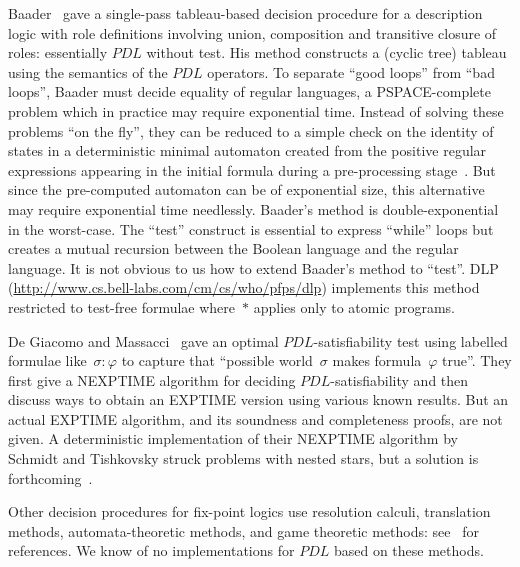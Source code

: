 \documentclass{entcs}
\newcommand{\prp}[1]{#1*}
\newcommand{\pdl}{$PDL$}
\begin{document}
Baader~\cite{baader-augmenting-transitive-closure}
gave a single-pass tableau-based decision procedure for a description logic
with role definitions involving union, composition and transitive closure of roles:
essentially \pdl{} without test.
His method constructs a (cyclic tree) tableau
using the semantics of the \pdl{} operators.
To separate ``good loops'' from ``bad loops'',
Baader must decide equality of regular languages,
a PSPACE-complete problem
which in practice may require exponential time.
Instead of solving these problems ``on the fly'',
they can be reduced to a simple check on the identity of states
in a deterministic minimal automaton
created from the positive regular expressions
appearing in the initial formula
during a pre-processing stage~\cite[page~27]{baader-augmenting-transitive-closure}.
But since the pre-computed automaton can be of exponential size,
this alternative may require exponential time needlessly. 
Baader's method is double-exponential in the worst-case.
The ``test'' construct is essential to express ``while'' loops
but creates a mutual recursion between the Boolean language
and the regular language.
It is not obvious to us how to extend Baader's method to ``test''.
DLP (\url{http://www.cs.bell-labs.com/cm/cs/who/pfps/dlp})
implements this method restricted to test-free formulae
where~$\prp{}$ applies only to atomic programs.

De Giacomo and Massacci~\cite{de-giacomo-massacci-tableaux-converse-pdl}
gave an optimal \pdl{}-satisfiability test
using labelled formulae like~$\sigma:\varphi$ to capture
that ``possible world~$\sigma$ makes formula~$\varphi$ true''.
They first give a NEXPTIME algorithm for deciding \pdl{}-satisfiability 
and then discuss ways to obtain an EXPTIME version using various known results.
But an actual EXPTIME algorithm,
and its soundness and completeness proofs,
are not given.
A deterministic implementation of their NEXPTIME algorithm by Schmidt and Tishkovsky
struck problems with nested stars,
but a solution is forthcoming~\cite{schmidt-tishkovsky-pdl-tableau}.

Other decision procedures for fix-point logics use resolution calculi,
translation methods, automata-theoretic methods, and game theoretic methods:
see~\cite{abate-gore-widmann-onepass-ctl-lpar} for references.
We know of no implementations for \pdl{} based on these methods.
\end{document}
